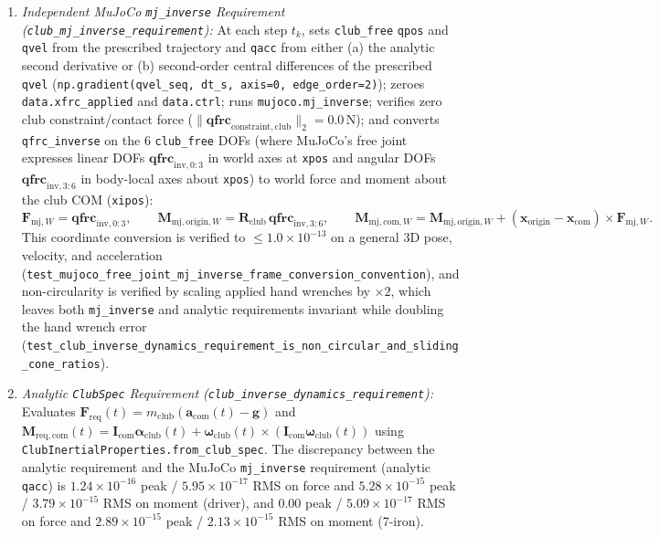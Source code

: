 \documentclass[11pt,a4paper]{article}
\begin{document}
\begin{enumerate}[leftmargin=*,noitemsep]
  \item \textit{Independent MuJoCo \texttt{mj\_inverse} Requirement (\texttt{club\_mj\_inverse\_requirement}):} At each step $t_k$, sets \texttt{club\_free} \texttt{qpos} and \texttt{qvel} from the prescribed trajectory and \texttt{qacc} from either (a) the analytic second derivative or (b) second-order central differences of the prescribed \texttt{qvel} (\texttt{np.gradient(qvel\_seq, dt\_s, axis=0, edge\_order=2)}); zeroes \texttt{data.xfrc\_applied} and \texttt{data.ctrl}; runs \texttt{mujoco.mj\_inverse}; verifies zero club constraint/contact force ($\|\mathbf{qfrc}_{\mathrm{constraint,club}}\|_2 = 0.0\,\mathrm{N}$); and converts \texttt{qfrc\_inverse} on the $6$ \texttt{club\_free} DOFs (where MuJoCo's free joint expresses linear DOFs $\mathbf{qfrc}_{\mathrm{inv},0:3}$ in world axes at \texttt{xpos} and angular DOFs $\mathbf{qfrc}_{\mathrm{inv},3:6}$ in body-local axes about \texttt{xpos}) to world force and moment about the club COM (\texttt{xipos}):
  \begin{equation}
    \mathbf{F}_{\mathrm{mj},W} = \mathbf{qfrc}_{\mathrm{inv},0:3}, \qquad
    \mathbf{M}_{\mathrm{mj,origin},W} = \mathbf{R}_{\mathrm{club}}\,\mathbf{qfrc}_{\mathrm{inv},3:6}, \qquad
    \mathbf{M}_{\mathrm{mj,com},W} = \mathbf{M}_{\mathrm{mj,origin},W} + (\mathbf{x}_{\mathrm{origin}} - \mathbf{x}_{\mathrm{com}}) \times \mathbf{F}_{\mathrm{mj},W}.
  \end{equation}
  This coordinate conversion is verified to $\le 1.0 \times 10^{-13}$ on a general 3D pose, velocity, and acceleration (\texttt{test\_mujoco\_free\_joint\_mj\_inverse\_frame\_conversion\_convention}), and non-circularity is verified by scaling applied hand wrenches by $\times 2$, which leaves both \texttt{mj\_inverse} and analytic requirements invariant while doubling the hand wrench error (\texttt{test\_club\_inverse\_dynamics\_requirement\_is\_non\_circular\_and\_sliding\_cone\_ratios}).
  \item \textit{Analytic \texttt{ClubSpec} Requirement (\texttt{club\_inverse\_dynamics\_requirement}):} Evaluates $\mathbf{F}_{\mathrm{req}}(t) = m_{\mathrm{club}}(\mathbf{a}_{\mathrm{com}}(t) - \mathbf{g})$ and $\mathbf{M}_{\mathrm{req,com}}(t) = \mathbf{I}_{\mathrm{com}}\boldsymbol{\alpha}_{\mathrm{club}}(t) + \boldsymbol{\omega}_{\mathrm{club}}(t) \times (\mathbf{I}_{\mathrm{com}}\boldsymbol{\omega}_{\mathrm{club}}(t))$ using \texttt{ClubInertialProperties.from\_club\_spec}. The discrepancy between the analytic requirement and the MuJoCo \texttt{mj\_inverse} requirement (analytic \texttt{qacc}) is $1.24 \times 10^{-16}$ peak / $5.95 \times 10^{-17}$ RMS on force and $5.28 \times 10^{-15}$ peak / $3.79 \times 10^{-15}$ RMS on moment (driver), and $0.00$ peak / $5.09 \times 10^{-17}$ RMS on force and $2.89 \times 10^{-15}$ peak / $2.13 \times 10^{-15}$ RMS on moment (7-iron).
\end{enumerate}
\end{document}
